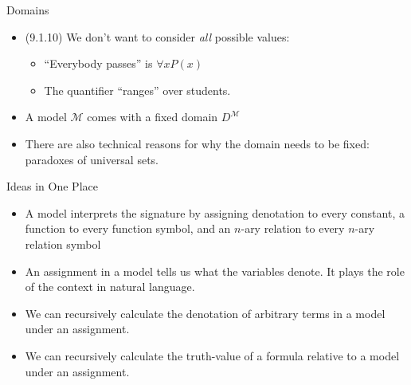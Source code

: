 \begin{frame}{Domains}

	\begin{itemize}
	
		\item (9.1.10) We don't want to consider \emph{all} possible values:
		
		\begin{itemize}
		
			\item ``Everybody passes'' is $\forall xP(x)$
			
			\item The quantifier ``ranges'' over students.
		
		\end{itemize}
		
		\item A model $\mathcal{M}$ comes with a fixed domain $D^\mathcal{M}$
		
		\item There are also technical reasons for why the domain needs to be fixed: paradoxes of universal sets.
			
	\end{itemize}

\end{frame}

\begin{frame}{Ideas in One Place}

	\begin{itemize}
	
		\item A model interprets the signature by assigning denotation to every constant, a function to every function symbol, and an $n$-ary relation to every $n$-ary relation symbol
		
		\item An assignment in a model tells us what the variables denote. It plays the role of the context in natural language. 
	
		\item We can recursively calculate the denotation of arbitrary terms in a model under an assignment.
		
		\item We can recursively calculate the truth-value of a formula relative to a model under an assignment.
	
	\end{itemize}


\end{frame}

